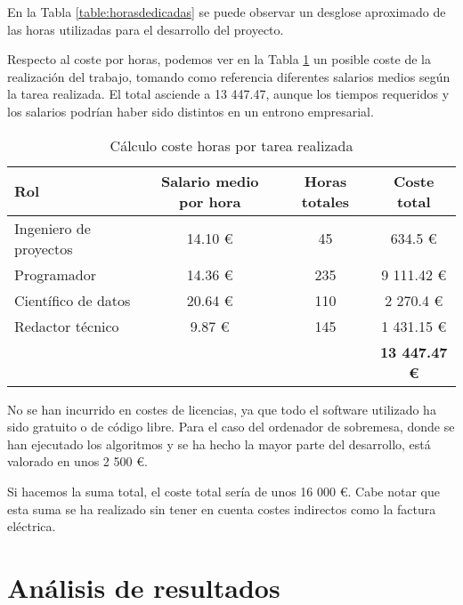 En la Tabla \ref{table:horasdedicadas} se puede observar un desglose aproximado de las horas utilizadas para el desarrollo del proyecto.

Respecto al coste por horas, podemos ver en la Tabla \ref{table:salarios} un posible coste de la realización del trabajo, tomando como referencia diferentes salarios medios según la tarea realizada. El total asciende a 13 447.47, aunque los tiempos requeridos y los salarios podrían haber sido distintos en un entrono empresarial.

\begin{table}[H]
  \centering
  \begin{tabular}{|l | c c c |}
      \hline
      \rowcolor{lightgray} \textbf{Rol} & \textbf{Salario medio por hora}            & \textbf{Horas totales} & \textbf{Coste total} \\ \hline
      Ingeniero de proyectos            & 14.10 € \cite{salarioingenierodeproyectos} &  45                    &    634.5  €          \\
      Programador                       & 14.36 € \cite{salarioprogramador}          & 235                    &  9 111.42 €          \\
      Científico de datos               & 20.64 € \cite{salariodatasci}              & 110                    &  2 270.4  €          \\
      Redactor técnico                  &  9.87 € \cite{salarioredactor}             & 145                    &  1 431.15 €          \\ \hline
      \rowcolor{lightgray}              &                                           &                        & \textbf{13 447.47 €}  \\
      \hline
  \end{tabular}
  \caption{Cálculo coste horas por tarea realizada}
  \label{table:salarios}
\end{table}

No se han incurrido en costes de licencias, ya que todo el software utilizado ha sido gratuito o de código libre. Para el caso del ordenador de sobremesa, donde se han ejecutado los algoritmos y se ha hecho la mayor parte del desarrollo, está valorado en unos 2 500 €.

Si hacemos la suma total, el coste total sería de unos 16 000 €. Cabe notar que esta suma se ha realizado sin tener en cuenta costes indirectos como la factura eléctrica.

\section{Análisis de resultados}

